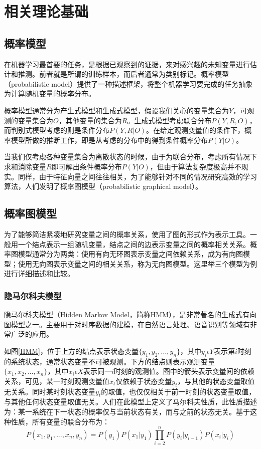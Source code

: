 
\chapter{相关理论基础}
\section{概率模型}
在机器学习最首要的任务，是根据已观察到的证据，来对感兴趣的未知变量进行估计和推测。前者就是所谓的训练样本，而后者通常为类别标记。概率模型（probabilistic model）提供了一种描述框架，将整个机器学习要完成的任务抽象为计算随机变量的概率分布。

概率模型通常分为产生式模型和生成式模型，假设我们关心的变量集合为\(Y\)，可观测的变量集合为\(O\)，其他变量的集合为\(R\)。生成式模型考虑联合分布\(P(Y, R, O)\)，而判别式模型考虑的则是条件分布\(P(Y, R | O)\)。在给定观测变量值的条件下，概率模型所做的推断工作，即是从考虑的分布中的得到条件概率分布\(P(Y | O)\)。

当我们仅考虑各种变量集合为离散状态的时候，由于为联合分布，考虑所有情况下求和消除变量\(R\)即可解出条件概率分布\(P(Y | O)\)，但由于算法复杂度极高并不现实。同样，由于特征向量之间往往相关，为了能够针对不同的情况研究高效的学习算法，人们发明了概率图模型（probabilistic graphical model）。

\section{概率图模型}
为了能够简洁紧凑地研究变量之间的概率关系，使用了图的形式作为表示工具。一般用一个结点表示一组随机变量，结点之间的边表示变量之间的概率相关关系。概率图模型通常分为两类：使用有向无环图表示变量之间依赖关系，成为有向图模型；使用无向图表示变量之间的相关关系，称为无向图模型。这里举三个模型为例进行详细描述和比较。
\subsection{隐马尔科夫模型}
隐马尔科夫模型（Hidden Markov Model，简称HMM），是非常著名的生成式有向图模型之一。主要用于对时序数据的建模，在自然语言处理、语音识别等领域有非常广泛的应用。


如图\ref{HMM}，位于上方的结点表示状态变量\(\{y_1,y_2,...,y_n\}\)，其中\(y_i \epsilon Y\)表示第\(i\)时刻的系统状态，通常状态变量不可被观测。下方的结点则表示观测变量\(\{x_1,x_2,...,x_n\}\)，其中\(x_i \epsilon X\)表示同一\(i\)时刻的观测值。图中的箭头表示变量间的依赖关系，可见，某一时刻观测变量值\(x_t\)仅依赖于状态变量\(y_t\)，与其他的状态变量取值无关系。同时某时刻状态变量\(y_t\)的取值，也仅仅相关于前一时刻的状态变量取值，与其他任何状态变量取值无关。人们在此模型上定义了马尔科夫性质，此性质描述为：某一系统在下一状态的概率仅与当前状态有关，而与之前的状态无关。基于这种性质，所有变量的联合分布为：\begin{equation}P(x_1,y_1,...,x_n,y_n)=P(y_1)P(x_1|y_1)\prod_{i=2}^{n}P(y_i|y_{i-1})P(x_i | y_i) \end{equation} 

